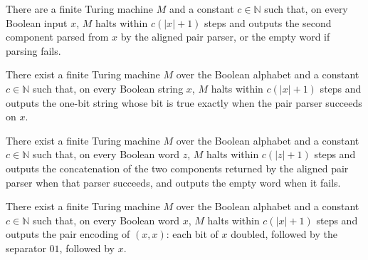 \begin{theorem}
\label{Turing.FinTM.computesFunInTime_pairSnd}
\leanok
{}
There are a finite Turing machine $M$ and a constant $c\in\mathbb{N}$ such that, on
every Boolean input $x$, $M$ halts within $c(|x|+1)$ steps and outputs the second
component parsed from $x$ by the aligned pair parser, or the empty word if parsing
fails.
\end{theorem}

\begin{theorem}
\label{Turing.FinTM.computesFunInTime_pairValid}
\leanok
{}
There exist a finite Turing machine $M$ over the Boolean alphabet and a constant
$c\in\mathbb{N}$ such that, on every Boolean string $x$, $M$ halts within $c(|x|+1)$
steps and outputs the one-bit string whose bit is true exactly when the pair parser
succeeds on $x$.
\end{theorem}

\begin{theorem}
\label{Turing.FinTM.computesFunInTime_pairConcat}
\leanok
{}
There exist a finite Turing machine $M$ over the Boolean alphabet and a constant
$c\in\mathbb{N}$ such that, on every Boolean word $z$, $M$ halts within $c(|z|+1)$ steps
and outputs the concatenation of the two components returned by the aligned pair parser
when that parser succeeds, and outputs the empty word when it fails.
\end{theorem}

\begin{theorem}
\label{Turing.FinTM.computesFunInTime_pairDup}
\leanok
{}
There exist a finite Turing machine $M$ over the Boolean alphabet and a constant
$c\in\mathbb{N}$ such that, on every Boolean word $x$, $M$ halts within $c(|x|+1)$ steps
and outputs the pair encoding of $(x,x)$: each bit of $x$ doubled, followed by the
separator $01$, followed by $x$.
\end{theorem}

